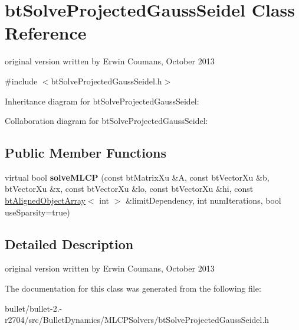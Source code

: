 \hypertarget{classbt_solve_projected_gauss_seidel}{\section{bt\+Solve\+Projected\+Gauss\+Seidel Class Reference}
\label{classbt_solve_projected_gauss_seidel}
}


original version written by Erwin Coumans, October 2013  




{\ttfamily \#include $<$bt\+Solve\+Projected\+Gauss\+Seidel.\+h$>$}



Inheritance diagram for bt\+Solve\+Projected\+Gauss\+Seidel\+:


Collaboration diagram for bt\+Solve\+Projected\+Gauss\+Seidel\+:
\subsection*{Public Member Functions}
\begin{DoxyCompactItemize}
\item 
\hypertarget{classbt_solve_projected_gauss_seidel_af012047de455174c3076ebe09fe0445e}{virtual bool {\bfseries solve\+M\+L\+C\+P} (const bt\+Matrix\+Xu \&A, const bt\+Vector\+Xu \&b, bt\+Vector\+Xu \&x, const bt\+Vector\+Xu \&lo, const bt\+Vector\+Xu \&hi, const \hyperlink{classbt_aligned_object_array}{bt\+Aligned\+Object\+Array}$<$ int $>$ \&limit\+Dependency, int num\+Iterations, bool use\+Sparsity=true)}\label{classbt_solve_projected_gauss_seidel_af012047de455174c3076ebe09fe0445e}

\end{DoxyCompactItemize}


\subsection{Detailed Description}
original version written by Erwin Coumans, October 2013 

The documentation for this class was generated from the following file\+:\begin{DoxyCompactItemize}
\item 
bullet/bullet-\/2.-\/r2704/src/\+Bullet\+Dynamics/\+M\+L\+C\+P\+Solvers/bt\+Solve\+Projected\+Gauss\+Seidel.\+h\end{DoxyCompactItemize}
